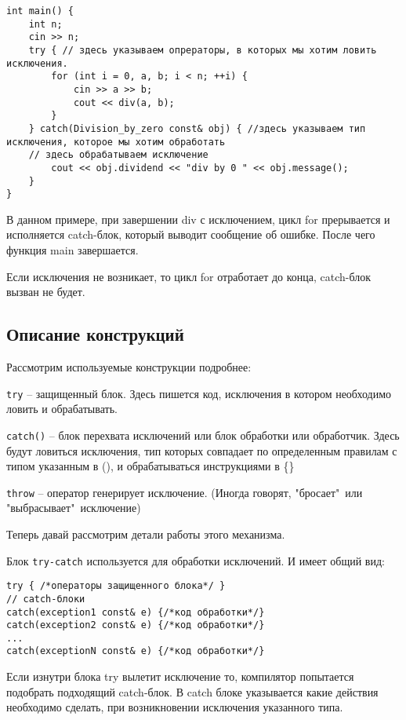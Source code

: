 \begin{verbatim}
int main() {
    int n;
    cin >> n;
    try { // здесь указываем опрераторы, в которых мы хотим ловить исключения.
        for (int i = 0, a, b; i < n; ++i) {
            cin >> a >> b;
            cout << div(a, b);
        }
    } catch(Division_by_zero const& obj) { //здесь указываем тип исключения, которое мы хотим обработать
    // здесь обрабатываем исключение
        cout << obj.dividend << "div by 0 " << obj.message();
    }
}
\end{verbatim}

В данном примере, при завершении div с исключением, цикл for прерывается и исполняется catch-блок, который выводит сообщение об ошибке. После чего функция main завершается.

Если исключения не возникает, то цикл for отработает до конца, catch-блок вызван не будет.

\subsection{Описание конструкций}
Рассмотрим используемые конструкции подробнее:

\texttt{try{}} -- защищенный блок. Здесь пишется код, исключения в котором необходимо ловить и обрабатывать.

\texttt{catch(){}} -- блок перехвата исключений или блок обработки или обработчик. Здесь будут ловиться исключения, тип которых совпадает по определенным правилам с типом указанным в (), и обрабатываться инструкциями в \{\}

\texttt{throw} -- оператор генерирует исключение. (Иногда говорят, "бросает"\ или "выбрасывает"\ исключение)

Теперь давай рассмотрим детали работы этого механизма.

Блок \texttt{try-catch} используется для обработки исключений. И имеет общий вид:
\begin{verbatim}
try { /*операторы защищенного блока*/ }
// catch-блоки
catch(exception1 const& e) {/*код обработки*/}
catch(exception2 const& e) {/*код обработки*/}
...
catch(exceptionN const& e) {/*код обработки*/}

\end{verbatim}
Если изнутри блока try вылетит исключение то, компилятор попытается подобрать подходящий catch-блок. В catch блоке указывается какие действия необходимо сделать, при возникновении исключения указанного типа.

